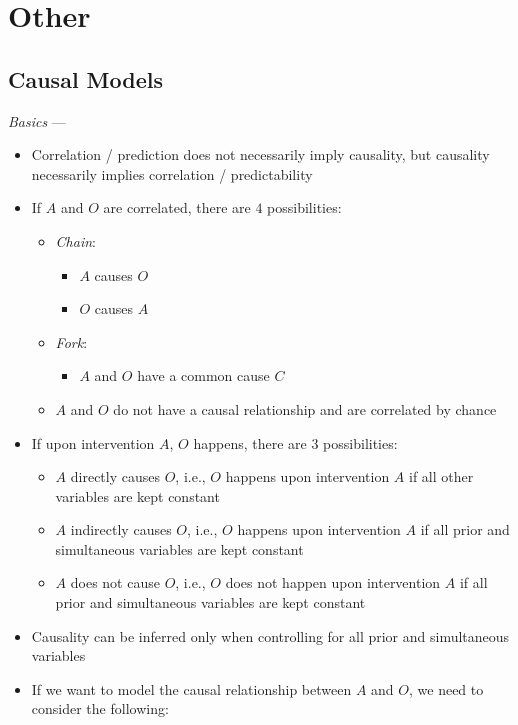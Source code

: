 \section{Other}
\subsection*{Causal Models}
\emph{Basics} ---
\begin{itemize}
    \item Correlation / prediction does not necessarily imply causality, but causality necessarily implies correlation / predictability
    \item If $A$ and $O$ are correlated, there are $4$ possibilities:
    \begin{itemize}
        \item \emph{Chain}:
        \begin{itemize}
            \item $A$ causes $O$
            \item $O$ causes $A$
        \end{itemize}
        \item \emph{Fork}:
        \begin{itemize}
            \item $A$ and $O$ have a common cause $C$
        \end{itemize}
        \item $A$ and $O$ do not have a causal relationship and are correlated by chance
    \end{itemize}
    \item If upon intervention $A$, $O$ happens, there are $3$ possibilities:
    \begin{itemize}
        \item $A$ directly causes $O$, i.e., $O$ happens upon intervention $A$ if all other variables are kept constant
        \item $A$ indirectly causes $O$, i.e., $O$ happens upon intervention $A$ if all prior and simultaneous variables are kept constant
        \item $A$ does not cause $O$, i.e., $O$ does not happen upon intervention $A$ if all prior and simultaneous variables are kept constant
    \end{itemize}
    \item Causality can be inferred only when controlling for all prior and simultaneous variables
    \item If we want to model the causal relationship between $A$ and $O$, we need to consider the following:

\end{itemize}
